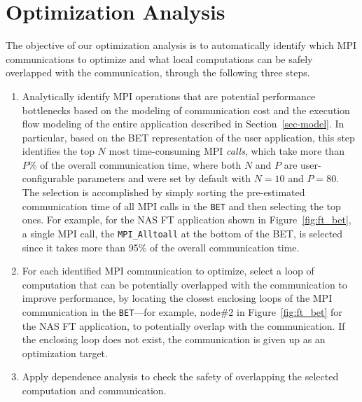 \section{Optimization Analysis}
\label {sec-analysis}

The objective of our optimization analysis is to automatically identify which MPI communications to optimize
and  what local computations can be safely overlapped with the communication, through the following three steps.

\begin{enumerate}

\item Analytically identify MPI operations that are potential
  performance bottlenecks based on the modeling of communication cost
  and the execution flow modeling of the entire application described
  in Section~\ref{sec-model}.  In particular, based on the BET
  representation of the user application, this step identifies the top
  $N$ most time-consuming MPI \emph{calls}, which take more than $P\%$
  of the overall communication time, where both $N$ and $P$ are
  user-configurable parameters and were set by default with $N=10$ and
  $P=80$.  The selection is accomplished by simply sorting the
  pre-estimated communication time of all MPI calls in the
  \texttt{BET} and then selecting the top ones.  For example, for the
  NAS FT application shown in Figure~\ref{fig:ft_bet}, a single MPI
  call, the \texttt{MPI\_Alltoall} at the bottom of the BET, is
  selected since it takes more than 95\% of the overall communication
  time.

\item For each identified MPI communication to optimize, select a loop
  of computation that can be potentially overlapped with the
  communication to improve performance, by locating the closest
  enclosing loops of the MPI communication in the \texttt{BET}---for
  example, node\#2 in Figure~\ref{fig:ft_bet} for the NAS FT
  application, to potentially overlap with the communication.  If the
  enclosing loop does not exist, the communication is given up as an
  optimization target.

\item Apply dependence analysis to check the safety of overlapping the
  selected computation and communication.

\end{enumerate}

